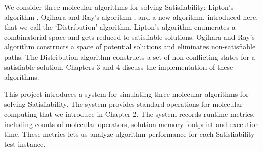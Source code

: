 We consider three molecular algorithms for solving {\sc Satisfiability}: Lipton's algorithm \cite{Lipton95usingdna}, Ogihara and Ray's algorithm \cite{Ogihara:1996:BFS:898228, Ogihara97dna-basedparallel}, and a new algorithm, introduced here, that we call the `Distribution' algorithm.  Lipton's algorithm enumerates a combinatorial space and gets reduced to satisfiable solutions.  Ogihara and Ray's algorithm constructs a space of potential solutions and eliminates non-satisfiable paths.  The Distribution algorithm constructs a set of non-conflicting states for a satisfiable solution.  Chapters 3 and 4 discuss the implementation of these algorithms.

This project introduces a system for simulating three molecular algorithms for solving {\sc Satisfiability}.  The system provides standard operations for molecular computing that we introduce in Chapter 2.  The system records runtime metrics, including counts of molecular operators, solution memory footprint and execution time.  These metrics lets us analyze algorithm performance for each {\sc Satisfiability} test instance.

